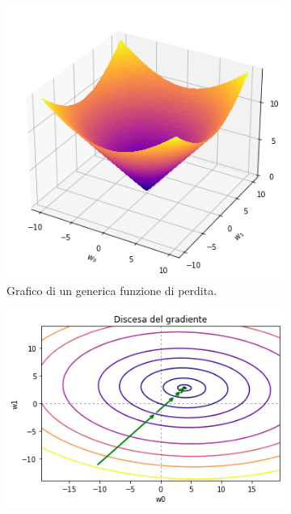 \documentclass[../../main.tex]{subfiles}
\begin{document}
    \begin{figure}[H]
        \centering
        \begin{subfigure}[t]{0.49\textwidth}
            \centering
            \includegraphics[width=\textwidth]{immagini/4_1/loss_function.png} 
            \caption{Grafico di un generica funzione di perdita.}
            \label{fig:funzioneLoss}      
        \end{subfigure}
        \begin{subfigure}[t]{0.49\textwidth}
            \centering
            \includegraphics[width=\textwidth]{immagini/4_1/discesa_gradiente.png} 

\end{subfigure}
\end{figure}
\end{document}

